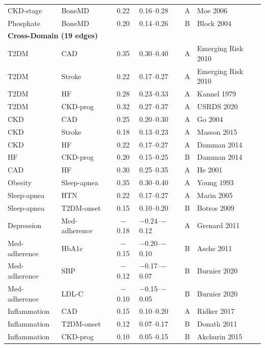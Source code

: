 \documentclass[runningheads]{llncs}
\begin{document}
{\begin{longtable}{@{}p{2.0cm}p{2.0cm}cp{1.4cm}cp{2.8cm}@{}}
CKD-stage & BoneMD & 0.22 & 0.16--0.28 & A & Moe 2006 \\
Phosphate & BoneMD & 0.20 & 0.14--0.26 & B & Block 2004 \\
\midrule
\multicolumn{6}{l}{\textbf{Cross-Domain (19 edges)}} \\
\midrule
T2DM & CAD & 0.35 & 0.30--0.40 & A & Emerging Risk 2010 \\
T2DM & Stroke & 0.22 & 0.17--0.27 & A & Emerging Risk 2010 \\
T2DM & HF & 0.28 & 0.23--0.33 & A & Kannel 1979 \\
T2DM & CKD-prog & 0.32 & 0.27--0.37 & A & USRDS 2020 \\
CKD & CAD & 0.25 & 0.20--0.30 & A & Go 2004 \\
CKD & Stroke & 0.18 & 0.13--0.23 & A & Masson 2015 \\
CKD & HF & 0.22 & 0.17--0.27 & A & Damman 2014 \\
HF & CKD-prog & 0.20 & 0.15--0.25 & B & Damman 2014 \\
CAD & HF & 0.30 & 0.25--0.35 & A & He 2001 \\
Obesity & Sleep-apnea & 0.35 & 0.30--0.40 & A & Young 1993 \\
Sleep-apnea & HTN & 0.22 & 0.17--0.27 & A & Marin 2005 \\
Sleep-apnea & T2DM-onset & 0.15 & 0.10--0.20 & B & Botros 2009 \\
Depression & Med-adherence & $-$0.18 & $-$0.24--$-$0.12 & A & Grenard 2011 \\
Med-adherence & HbA1c & $-$0.15 & $-$0.20--$-$0.10 & B & Asche 2011 \\
Med-adherence & SBP & $-$0.12 & $-$0.17--$-$0.07 & B & Burnier 2020 \\
Med-adherence & LDL-C & $-$0.10 & $-$0.15--$-$0.05 & B & Burnier 2020 \\
Inflammation & CAD & 0.15 & 0.10--0.20 & A & Ridker 2017 \\
Inflammation & T2DM-onset & 0.12 & 0.07--0.17 & B & Donath 2011 \\
Inflammation & CKD-prog & 0.10 & 0.05--0.15 & B & Akchurin 2015 \\
\end{longtable}
}
\end{document}
